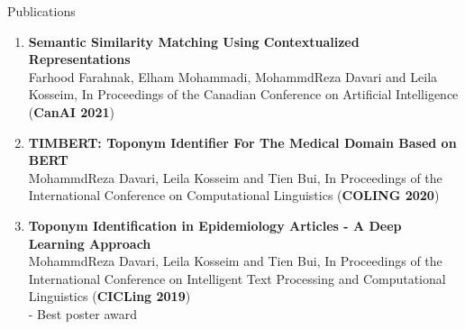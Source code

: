 \documentclass{resume} %
\newcommand{\pub}[3]{\textbf{#1}\\{\small #2} {\small (\textbf{#3})}} %
\begin{document}
\begin{rSection}{Publications}
\begin{enumerate}[leftmargin=0.0em]
    \item \pub{Semantic Similarity Matching Using Contextualized Representations}{
    Farhood Farahnak, Elham Mohammadi, MohammdReza Davari and Leila Kosseim, In Proceedings of the Canadian Conference on Artificial Intelligence}{CanAI 2021}

    \item \pub{TIMBERT: Toponym Identifier For The Medical Domain Based on BERT}{
    MohammdReza Davari, Leila Kosseim and Tien Bui, In Proceedings of the International Conference on Computational Linguistics}{COLING 2020}

    \item \pub{Toponym Identification in Epidemiology Articles - A Deep Learning Approach} 
    {MohammdReza Davari, Leila Kosseim and Tien Bui, In Proceedings of the International Conference on Intelligent Text Processing and Computational Linguistics}{CICLing 2019}
    \\ - Best poster award
    
    
\end{enumerate}
\end{rSection}
\end{document}
